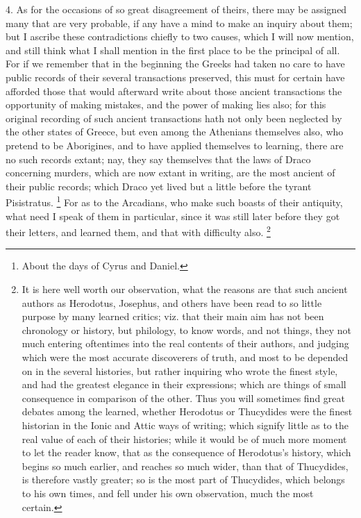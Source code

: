 4. As for the occasions of so great disagreement of theirs, there may be
assigned many that are very probable, if any have a mind to make an
inquiry about them; but I ascribe these contradictions chiefly to two
causes, which I will now mention, and still think what I shall mention in
the first place to be the principal of all. For if we remember that in the
beginning the Greeks had taken no care to have public records of their
several transactions preserved, this must for certain have afforded those
that would afterward write about those ancient transactions the
opportunity of making mistakes, and the power of making lies also; for
this original recording of such ancient transactions hath not only been
neglected by the other states of Greece, but even among the Athenians
themselves also, who pretend to be Aborigines, and to have applied
themselves to learning, there are no such records extant; nay, they say
themselves that the laws of Draco concerning murders, which are now extant
in writing, are the most ancient of their public records; which Draco yet
lived but a little before the tyrant Pisistratus. \footnote{About the days of Cyrus and
Daniel.} For as to the
Arcadians, who make such boasts of their antiquity, what need I speak of
them in particular, since it was still later before they got their
letters, and learned them, and that with difficulty also. \footnote{It is here well worth our
observation, what the reasons are that such ancient authors as Herodotus,
Josephus, and others have been read to so little purpose by many learned
critics; viz. that their main aim has not been chronology or history, but
philology, to know words, and not things, they not much entering
oftentimes into the real contents of their authors, and judging which were
the most accurate discoverers of truth, and most to be depended on in the
several histories, but rather inquiring who wrote the finest style, and
had the greatest elegance in their expressions; which are things of small
consequence in comparison of the other. Thus you will sometimes find great
debates among the learned, whether Herodotus or Thucydides were the finest
historian in the Ionic and Attic ways of writing; which signify little as
to the real value of each of their histories; while it would be of much
more moment to let the reader know, that as the consequence of Herodotus's
history, which begins so much earlier, and reaches so much wider, than
that of Thucydides, is therefore vastly greater; so is the most part of
Thucydides, which belongs to his own times, and fell under his own
observation, much the most certain.}

